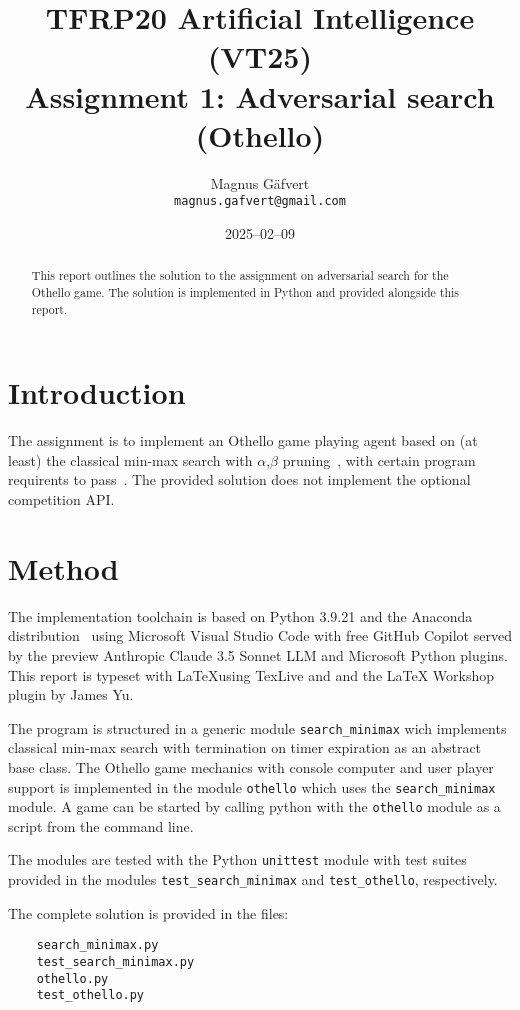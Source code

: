 \documentclass[a4paper]{article}
\title{TFRP20 Artificial Intelligence (VT25)\\ Assignment 1: Adversarial search (Othello)}
\author{Magnus Gäfvert\\\texttt{magnus.gafvert@gmail.com}}
\date{2025--02--09}
\begin{document}
\maketitle
\begin{abstract}
    This report outlines the solution to the assignment on adversarial search for the Othello game. The solution is implemented in Python and provided alongside this report.
\end{abstract}

\section{Introduction}
The assignment is to implement an Othello game playing agent based on (at least) the classical min-max search with $\alpha$,$\beta$ pruning~\cite{aima}, with certain program requirents to pass~\cite{tfrp20assignment1}. The provided solution does not implement the optional competition API. 

\section{Method}
The implementation toolchain is based on Python 3.9.21 and the Anaconda distribution~\cite{anaconda} using Microsoft Visual Studio Code with free GitHub Copilot served by the preview Anthropic Claude 3.5 Sonnet LLM and Microsoft Python plugins. This report is typeset with \LaTeX using TexLive and and the LaTeX Workshop plugin by James Yu.

The program is structured in a generic module \texttt{search\_minimax} wich implements classical min-max search with termination on timer expiration as an abstract base class. The Othello game mechanics with console computer and user player support is implemented in the module \texttt{othello} which uses the \texttt{search\_minimax} module. A game can be started by calling python with the \texttt{othello} module as a script from the command line.

The modules are tested with the Python \texttt{unittest} module with test suites provided in the modules \texttt{test\_search\_minimax} and \texttt{test\_othello}, respectively.

The complete solution is provided in the files:
\begin{verbatim}
    search_minimax.py
    test_search_minimax.py
    othello.py
    test_othello.py
\end{verbatim}
\end{document}

